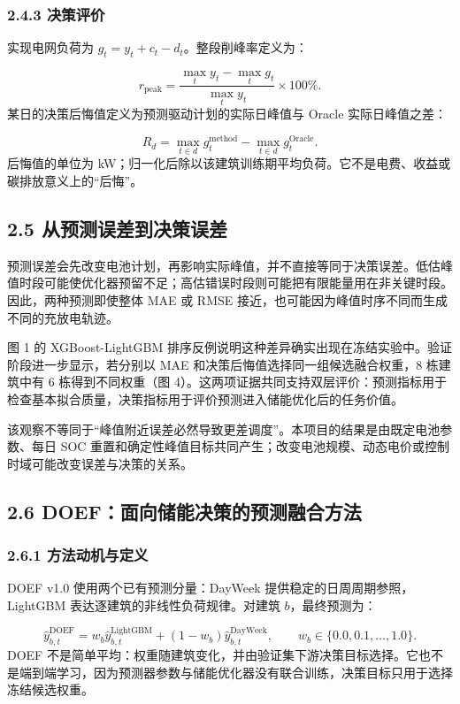 \documentclass[12pt,a4paper]{article}
\begin{document}
\subsubsection{2.4.3 决策评价}
实现电网负荷为 \(g_t=y_t+c_t-d_t\)。整段削峰率定义为：\par
\[
r_{\text{peak}}=\frac{\max_t y_t-\max_t g_t}{\max_t y_t}\times100\%.
\]
某日的决策后悔值定义为预测驱动计划的实际日峰值与 Oracle 实际日峰值之差：\par
\[
R_d=\max_{t\in d}g_t^{\text{method}}-\max_{t\in d}g_t^{\text{Oracle}}.
\]
后悔值的单位为 kW；归一化后除以该建筑训练期平均负荷。它不是电费、收益或碳排放意义上的“后悔”。\par
\subsection{2.5 从预测误差到决策误差}
预测误差会先改变电池计划，再影响实际峰值，并不直接等同于决策误差。低估峰值时段可能使优化器预留不足；高估错误时段则可能把有限能量用在非关键时段。因此，两种预测即使整体 MAE 或 RMSE 接近，也可能因为峰值时序不同而生成不同的充放电轨迹。\par
图 1 的 XGBoost-LightGBM 排序反例说明这种差异确实出现在冻结实验中。验证阶段进一步显示，若分别以 MAE 和决策后悔值选择同一组候选融合权重，8 栋建筑中有 6 栋得到不同权重（图 4）。这两项证据共同支持双层评价：预测指标用于检查基本拟合质量，决策指标用于评价预测进入储能优化后的任务价值。\par
该观察不等同于“峰值附近误差必然导致更差调度”。本项目的结果是由既定电池参数、每日 SOC 重置和确定性峰值目标共同产生；改变电池规模、动态电价或控制时域可能改变误差与决策的关系。\par
\subsection{2.6 DOEF：面向储能决策的预测融合方法}
\subsubsection{2.6.1 方法动机与定义}
DOEF v1.0 使用两个已有预测分量：DayWeek 提供稳定的日周周期参照，LightGBM 表达逐建筑的非线性负荷规律。对建筑 \(b\)，最终预测为：\par
\[
\hat{y}_{b,t}^{\text{DOEF}}
=w_b\hat{y}_{b,t}^{\text{LightGBM}}
+(1-w_b)\hat{y}_{b,t}^{\text{DayWeek}},
\qquad w_b\in\{0.0,0.1,\ldots,1.0\}.
\]
DOEF 不是简单平均：权重随建筑变化，并由验证集下游决策目标选择。它也不是端到端学习，因为预测器参数与储能优化器没有联合训练，决策目标只用于选择冻结候选权重。\par
\end{document}
